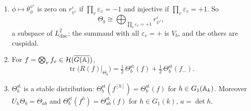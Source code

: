 \begin{proposition}\label{prop:theta-packet}
\begin{enumerate}[label=(\alph*)]
\item $\phi\mapsto\theta^{\psi'}_\phi$ is zero on $r^\varepsilon_{\psi'}$ if
  $\prod_v\varepsilon_v=-1$ and injective if $\prod_v\varepsilon_v=+1$. So
  \[
  \Theta_b\cong\bigoplus_{\prod_v\varepsilon_v=+1}r^\varepsilon_{\psi'},
  \]
  a subspace of $L^2_{\mathrm{disc}}$; the summand with all
  $\varepsilon_v=+$ is $V_b$, and the others are cuspidal.
\item For $f=\bigotimes_vf_v\in\mathcal H(\overline{G(\mathbb{A})})$,
  \[
  \operatorname{tr}\bigl(R(f)\big|_{\Theta_b}\bigr)=\tfrac12\,
  \Theta^{\mathrm{st}}_b(f)+\tfrac12\,\Theta^{\mathrm{st}}_b(f_-).
  \]
\item $\Theta^{\mathrm{st}}_b$ is a stable distribution:
  $\Theta^{\mathrm{st}}_b(f^{[h]})=\Theta^{\mathrm{st}}_b(f)$ for
  $h\in G_1(\mathbb{A}_k)$. Moreover $U_h\Theta_b=\Theta_{ab}$ and
  $\Theta^{\mathrm{st}}_b(f^h)=\Theta^{\mathrm{st}}_{ab}(f)$ for
  $h\in G_1(k)$, $a=\det h$.
\end{enumerate}
\end{proposition}

